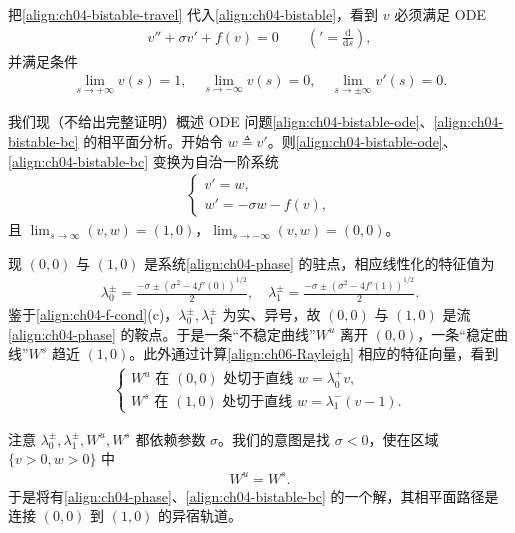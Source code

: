 \documentclass[../../main.tex]{subfiles}
\begin{document}
把\eqref{align:ch04-bistable-travel} 代入\eqref{align:ch04-bistable}，看到 $v$ 必须满足 ODE
\begin{align}\label{align:ch04-bistable-ode}
v''+\sigma v'+f(v)=0 \qquad('=\tfrac{\mathrm{d}}{\mathrm{d}s}),
\end{align}
并满足条件
\begin{align}\label{align:ch04-bistable-bc}
\lim_{s\to+\infty}v(s)=1,\quad \lim_{s\to-\infty}v(s)=0,\quad \lim_{s\to\pm\infty}v'(s)=0.
\end{align}

我们现（不给出完整证明）概述 ODE 问题\eqref{align:ch04-bistable-ode}、\eqref{align:ch04-bistable-bc} 的相平面分析。开始令 $w\triangleq v'$。则\eqref{align:ch04-bistable-ode}、\eqref{align:ch04-bistable-bc} 变换为自治一阶系统
\begin{align}\label{align:ch04-phase}
\begin{cases}
v'=w,\\
w'=-\sigma w-f(v),
\end{cases}
\end{align}
且 $\lim_{s\to\infty}(v,w)=(1,0)$，$\lim_{s\to-\infty}(v,w)=(0,0)$。

现 $(0,0)$ 与 $(1,0)$ 是系统\eqref{align:ch04-phase} 的驻点，相应线性化的特征值为
\begin{align}\label{align:ch06-Rayleigh}
\lambda_0^\pm=\frac{-\sigma\pm(\sigma^2-4f'(0))^{1/2}}{2},\quad
\lambda_1^\pm=\frac{-\sigma\pm(\sigma^2-4f'(1))^{1/2}}{2}.
\end{align}
鉴于\eqref{align:ch04-f-cond}(c)，$\lambda_0^\pm,\lambda_1^\pm$ 为实、异号，故 $(0,0)$ 与 $(1,0)$ 是流\eqref{align:ch04-phase} 的鞍点。于是一条``不稳定曲线''$W^u$ 离开 $(0,0)$，一条``稳定曲线''$W^s$ 趋近 $(1,0)$。此外通过计算\eqref{align:ch06-Rayleigh} 相应的特征向量，看到
\begin{align}\label{align:ch04-curves-tangent}
\begin{cases}
W^u\text{ 在 }(0,0)\text{ 处切于直线 }w=\lambda_0^+ v,\\
W^s\text{ 在 }(1,0)\text{ 处切于直线 }w=\lambda_1^-(v-1).
\end{cases}
\end{align}

注意 $\lambda_0^\pm,\lambda_1^\pm,W^u,W^s$ 都依赖参数 $\sigma$。我们的意图是找 $\sigma<0$，使在区域 $\{v>0,w>0\}$ 中
\begin{align}\label{align:ch04-curves-equal}
W^u=W^s.
\end{align}
于是将有\eqref{align:ch04-phase}、\eqref{align:ch04-bistable-bc} 的一个解，其相平面路径是连接 $(0,0)$ 到 $(1,0)$ 的异宿轨道。
\end{document}
